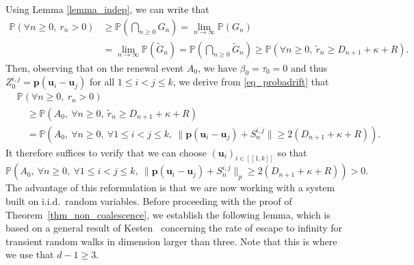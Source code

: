 \documentclass[a4paper, 11pt]{article}
\theoremstyle{plain}
\theoremstyle{definition}
\renewcommand{\P}{\mathbb{P}}
\newcommand{\range}[2]{[\![#1,#2]\!]}
\numberwithin{equation}{section}
\begin{document}
Using Lemma \ref{lemma_indep}, we can write that
    \begin{equation}
        \label{eq_probadrift}
        \begin{split}
            \P(\forall n\geq0,~r_n>0)&\geq\P\left(\bigcap_{n\geq 0}G_n\right)
            =\lim_{n\to\infty}\P(G_n)\\
            &=\lim_{n\to\infty}\P(\tilde G_n)
            =\P\left(\bigcap_{n\geq 0}\tilde G_n\right)
            \geq\P(\forall n\geq 0,~\tilde r_n\geq D_{n+1}+\kappa+R).
        \end{split}
    \end{equation}
Then, observing that on the renewal event $A_0$, we have $\beta_0=\tau_0=0$ and thus $Z_0^{i, j}=\mathbf p(\mathbf u_i-\mathbf u_j)$ for all $1\leq i<j\leq k$, we derive from \eqref{eq_probadrift} that
    \begin{equation*}
        \begin{split}
            &\P(\forall n\geq0,~r_n>0)\\
            &\quad\geq\P(A_0,~\forall n\geq 0,~\tilde r_n\geq D_{n+1}+\kappa+R)\\
            &\quad=\P(A_0,~\forall n\geq0,~\forall 1\leq i<j\leq k,~\|\mathbf p(\mathbf u_i-\mathbf u_j)+S_n^{i, j}\|\geq2(D_{n+1}+\kappa+R)).
        \end{split}
    \end{equation*}
It therefore suffices to verify that we can choose $(\mathbf u_i)_{i\in\range{1}{k}}$ so that
    \begin{equation}
        \label{eq_non-coal_proba}
        \P(A_0,~\forall n\geq0,~\forall 1\leq i<j\leq k,~\|\mathbf p(\mathbf u_i-\mathbf u_j)+S_n^{i, j}\|_p\geq2(D_{n+1}+\kappa+R))>0.
    \end{equation}
The advantage of this reformulation is that we are now working with a system built on i.i.d.\ random variables. Before proceeding with the proof of Theorem~\ref{thm_non_coalescence}, we establish the following lemma, which is based on a general result of Kesten~\cite{KestenErickson} concerning the rate of escape to infinity for transient random walks in dimension larger than three. Note that this is where we use that $d-1\geq 3$.



\end{document}

